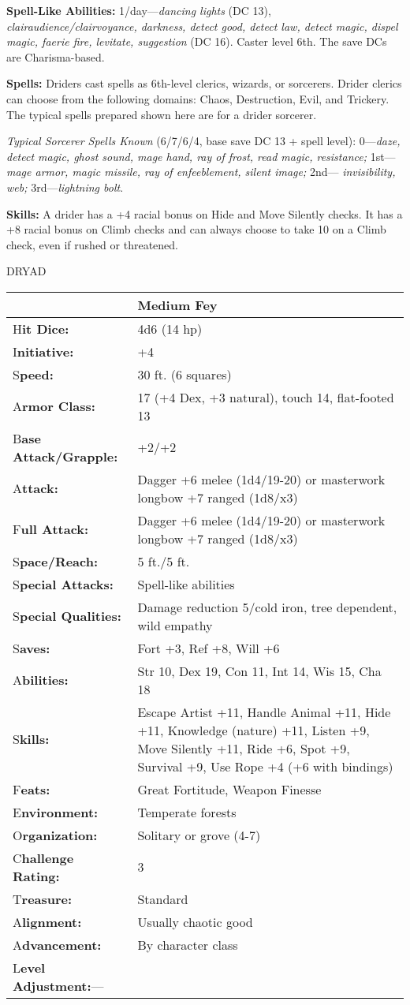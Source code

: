 \documentclass{article}
\begin{document}
{\textbf{Spell-Like Abilities: }1/day---\textit{dancing lights }(DC 13), \textit{clairaudience/clairvoyance, 
darkness, detect good, detect law, detect magic, dispel magic, faerie fire, levitate, 
suggestion }(DC 16). Caster level 6th. The save DCs are Charisma-based.

\textbf{Spells:} Driders cast spells as 6th-level clerics, wizards, or sorcerers. 
Drider clerics can choose from the following domains: Chaos, Destruction, Evil, 
and Trickery. The typical spells prepared shown here are for a drider sorcerer.

\textit{Typical Sorcerer Spells Known }(6/7/6/4, base save DC 13 + spell level): 
0---\textit{daze, detect magic, ghost sound, mage hand, ray of frost, read magic, 
resistance; }1st---\textit{mage armor, magic missile, ray of enfeeblement, silent 
image; }2nd--- \textit{invisibility, web; }3rd---\textit{lightning bolt}.

\textbf{Skills: }A drider has a +4 racial bonus on Hide and Move Silently checks. 
It has a +8 racial bonus on Climb checks and can always choose to take 10 on a 
Climb check, even if rushed or threatened.

\vspace{12pt}
{\LARGE{}DRYAD}

\begin{tabular}{|>{\raggedright}p{91pt}|>{\raggedright}p{196pt}|}
\hline
  & Medium Fey\tabularnewline
\hline
H\textbf{it Dice:} & 4d6 (14 hp)\tabularnewline
\hline
I\textbf{nitiative:} & +4\tabularnewline
\hline
S\textbf{peed:} & 30 ft. (6 squares)\tabularnewline
\hline
A\textbf{rmor Class:} & 17 (+4 Dex, +3 natural), touch 14, flat-footed 13\tabularnewline
\hline
B\textbf{ase Attack/Grapple:} & +2/+2\tabularnewline
\hline
A\textbf{ttack:} & Dagger +6 melee (1d4/19-20) or masterwork longbow +7 ranged 
(1d8/x3)\tabularnewline
\hline
F\textbf{ull Attack:} & Dagger +6 melee (1d4/19-20) or masterwork longbow +7 ranged 
(1d8/x3)\tabularnewline
\hline
S\textbf{pace/Reach:} & 5 ft./5 ft.\tabularnewline
\hline
S\textbf{pecial Attacks:} & Spell-like abilities\tabularnewline
\hline
S\textbf{pecial Qualities:} & Damage reduction 5/cold iron, tree dependent, wild 
empathy\tabularnewline
\hline
S\textbf{aves:} & Fort +3, Ref +8, Will +6\tabularnewline
\hline
A\textbf{bilities:} & Str 10, Dex 19, Con 11, Int 14, Wis 15, Cha 18\tabularnewline
\hline
S\textbf{kills:} & Escape Artist +11, Handle Animal +11, Hide +11, Knowledge (nature) 
+11, Listen +9, Move Silently +11, Ride +6, Spot +9, Survival +9, Use Rope +4 (+6 
with bindings)\tabularnewline
\hline
F\textbf{eats:} & Great Fortitude, Weapon Finesse\tabularnewline
\hline
E\textbf{nvironment:} & Temperate forests\tabularnewline
\hline
O\textbf{rganization:} & Solitary or grove (4-7)\tabularnewline
\hline
C\textbf{hallenge Rating:} & 3\tabularnewline
\hline
T\textbf{reasure:} & Standard\tabularnewline
\hline
A\textbf{lignment:} & Usually chaotic good\tabularnewline
\hline
A\textbf{dvancement:} & By character class\tabularnewline
\hline
L\textbf{evel Adjustment:}--- & \tabularnewline
\hline
\end{tabular}

}
\end{document}
